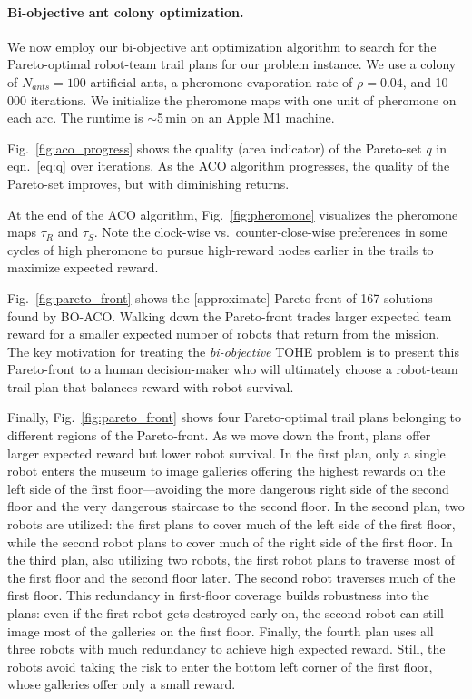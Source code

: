 \documentclass[11pt, oneside]{article}
\begin{document}
\paragraph{Bi-objective ant colony optimization.}
We now employ our bi-objective ant optimization algorithm to search for the Pareto-optimal robot-team trail plans for our problem instance.
We use a colony of $N_{ants}=100$ artificial ants, a pheromone evaporation rate of $\rho=0.04$, and 10\,000 iterations. We initialize the pheromone maps with one unit of pheromone on each arc.
The runtime is $\sim$5\,min on an Apple M1 machine.

Fig.~\ref{fig:aco_progress} shows the quality (area indicator) of the Pareto-set $q$ in eqn.~\ref{eq:q} over iterations. As the ACO algorithm progresses, the quality of the Pareto-set improves, but with diminishing returns. 

At the end of the ACO algorithm, Fig.~\ref{fig:pheromone} visualizes the pheromone maps $\tau_{R}$ and $\tau_S$.
 Note the clock-wise vs.\ counter-close-wise preferences in some cycles of high pheromone to pursue high-reward nodes earlier in the trails to maximize expected reward.

Fig.~\ref{fig:pareto_front} shows the [approximate] Pareto-front of 167 solutions found by BO-ACO. 
Walking down the Pareto-front trades larger expected team reward for a smaller expected number of robots that return from the mission. The key motivation for treating the \emph{bi-objective} TOHE problem is to present this Pareto-front to a human decision-maker who will ultimately choose a robot-team trail plan that balances reward with robot survival.

Finally, Fig.~\ref{fig:pareto_front} shows four Pareto-optimal trail plans belonging to different regions of the Pareto-front. 
As we move down the front, plans offer larger expected reward but lower robot survival.
In the first plan, only a single robot enters the museum to image galleries offering the highest rewards on the left side of the first floor---avoiding the more dangerous right side of the second floor and the very dangerous staircase to the second floor. 
In the second plan, two robots are utilized: the first plans to cover much of the left side of the first floor, while the second robot plans to cover much of the right side of the first floor.
In the third plan, also utilizing two robots, the first robot plans to traverse most of the first floor and the second floor later. The second robot traverses much of the first floor. This redundancy in first-floor coverage builds robustness into the plans: even if the first robot gets destroyed early on, the second robot can still image most of the galleries on the first floor.
Finally, the fourth plan uses all three robots with much redundancy to achieve high expected reward. Still, the robots avoid taking the risk to enter the bottom left corner of the first floor, whose galleries offer only a small reward.
\end{document}
